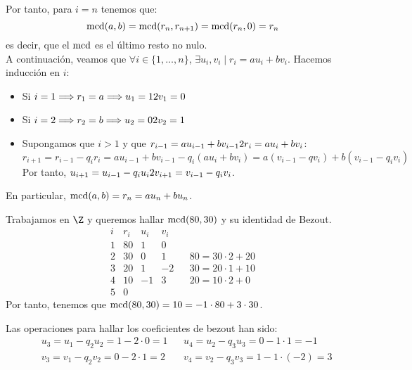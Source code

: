 \begin{enumerate}
    Por tanto, para $i=n$ tenemos que: $$\operatorname{mcd}(a,b) = \operatorname{mcd}(r_n, r_{n+1}) = \operatorname{mcd}(r_n, 0) = r_n$$
    es decir, que el $\operatorname{mcd}$ es el último resto no nulo.\\
    
    A continuación, veamos que $\forall i \in \{1, \ldots, n\}$, $\exists u_i, v_i \mid r_i = au_i + bv_i$. Hacemos inducción en $i$:
    \begin{itemize}
        \item Si $i=1 \Longrightarrow r_1 = a \Longrightarrow u_1 = 1 2 v_1 = 0$
        \item Si $i=2 \Longrightarrow r_2 = b \Longrightarrow u_2 = 0 2 v_2 = 1$
        \item Supongamos que $i>1$ y que $r_{i-1} = au_{i-1}+bv_{i-1} 2 r_i = au_i + bv_i$:
        $$r_{i+1} = r_{i-1}-q_ir_i = au_{i-1}+bv_{i-1} - q_i(au_i +bv_i) = a(v_{i-1}-qv_i)+b(v_{i-1}-q_iv_i)$$
        Por tanto, $u_{i+1} = u_{i-1}-q_iu_i 2 v_{i+1} = v_{i-1}-q_iv_i$.
    \end{itemize}
\end{enumerate}

En particular, $\operatorname{mcd}(a,b) = r_n =au_n + bu_n$.

\begin{ejemplo}
    Trabajamos en $\Z$ y queremos hallar $\operatorname{mcd}(80,30)$ y su identidad de Bezout.
    $$\begin{array}{c|c|c|c||cl}
        i & r_i & u_i & v_i && \\
        \hline
        1 & 80  & 1   & 0 &&   \\
        2 & 30  & 0   & 1 &&  80=30\cdot 2 + 20\\
        3 & 20  & 1   & -2 && 30 = 20 \cdot 1 + 10\\
        4 & 10  & -1  & 3  &&  20 = 10\cdot 2 + 0\\
        5 & 0   &     &&& 
    \end{array}$$
    Por tanto, tenemos que $\operatorname{mcd}(80,30) = 10 = -1 \cdot 80 + 3 \cdot 30$.
    
    Las operaciones para hallar los coeficientes de bezout han sido:
    \begin{align*}
        & u_3 = u_1 - q_2u_2 = 1- 2 \cdot 0 = 1
        && u_4 = u_2 - q_3u_3 = 0 - 1 \cdot 1 = -1\\
        & v_3 = v_1 - q_2v_2 = 0 - 2\cdot 1 = 2 
        && v_4 = v_2 - q_3v_3 = 1 - 1\cdot(-2) = 3
    \end{align*}
\end{ejemplo}


